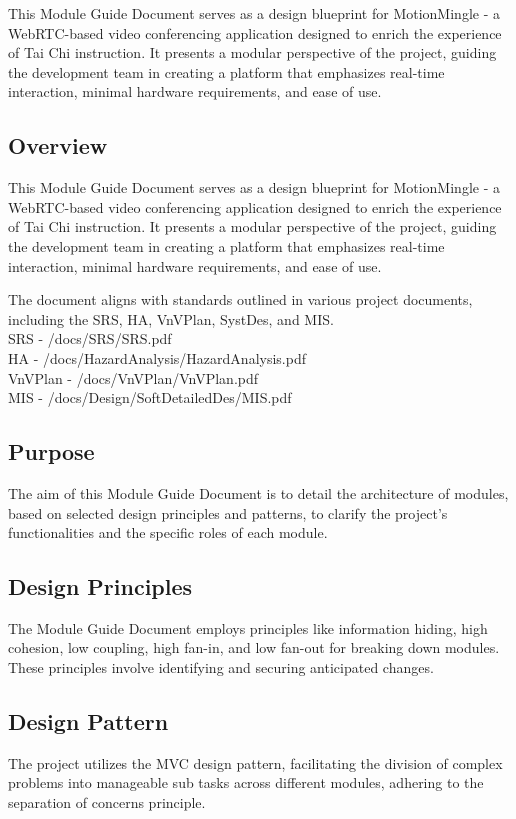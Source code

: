 \documentclass[12pt, titlepage]{article}
\begin{document}
This Module Guide Document serves as a design blueprint for MotionMingle - a WebRTC-based video conferencing application designed to enrich the experience of Tai Chi instruction. It presents a modular perspective of the project, guiding the development team in creating a platform that emphasizes real-time interaction, minimal hardware requirements, and ease of use.

\subsection{Overview}
This Module Guide Document serves as a design blueprint for MotionMingle - a WebRTC-based video conferencing application designed to enrich the experience of Tai Chi instruction. It presents a modular perspective of the project, guiding the development team in creating a platform that emphasizes real-time interaction, minimal hardware requirements, and ease of use.

The document aligns with standards outlined in various project documents, including the SRS, HA, VnVPlan, SystDes, and MIS. \\

SRS - /docs/SRS/SRS.pdf \\

HA - /docs/HazardAnalysis/HazardAnalysis.pdf \\

VnVPlan - /docs/VnVPlan/VnVPlan.pdf \\ 

MIS - /docs/Design/SoftDetailedDes/MIS.pdf \\

\subsection{Purpose}
The aim of this Module Guide Document is to detail the architecture of modules, based on selected design principles and patterns, to clarify the project’s functionalities and the specific roles of each module.

\subsection{Design Principles}
The Module Guide Document employs principles like information hiding, high cohesion, low coupling, high fan-in, and low fan-out for breaking down modules. These principles involve identifying and securing anticipated changes.

\subsection{Design Pattern}
The project utilizes the MVC design pattern, facilitating the division of complex problems into manageable sub tasks across different modules, adhering to the separation of concerns principle.
\end{document}
